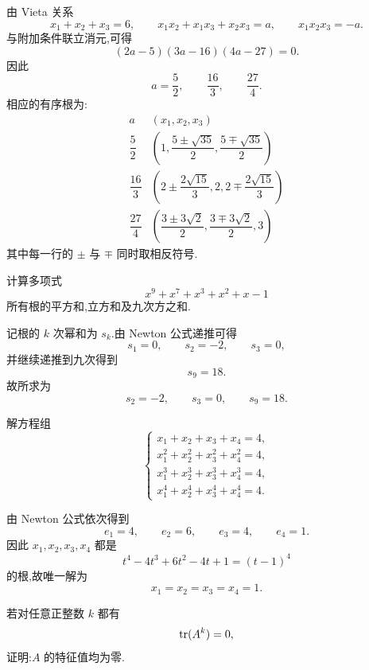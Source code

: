 \begin{solution}
由 Vieta 关系
\[
  x_1+x_2+x_3=6,
  \qquad
  x_1x_2+x_1x_3+x_2x_3=a,
  \qquad
  x_1x_2x_3=-a.
\]
与附加条件联立消元,可得
\[
  (2a-5)(3a-16)(4a-27)=0.
\]
因此
\[
  a=\dfrac52,\qquad \dfrac{16}{3},\qquad \dfrac{27}{4}.
\]
相应的有序根为:
\[
\begin{array}{c|c}
 a & (x_1,x_2,x_3)\\ \hline
 \dfrac52 & \left(1,\dfrac{5\pm\sqrt{35}}2,\dfrac{5\mp\sqrt{35}}2\right)\\[1.2ex]
 \dfrac{16}{3} & \left(2\pm\dfrac{2\sqrt{15}}3,2,2\mp\dfrac{2\sqrt{15}}3\right)\\[1.2ex]
 \dfrac{27}{4} & \left(\dfrac{3\pm3\sqrt2}{2},\dfrac{3\mp3\sqrt2}{2},3\right)
\end{array}
\]
其中每一行的 $\pm$ 与 $\mp$ 同时取相反符号.
\end{solution}

\begin{example}
计算多项式
\[
  x^9+x^7+x^3+x^2+x-1
\]
所有根的平方和,立方和及九次方之和.
\end{example}
\exampleblank

\begin{solution}
记根的 $k$ 次幂和为 $s_k$.由 Newton 公式递推可得
\[
  s_1=0,
  \qquad
  s_2=-2,
  \qquad
  s_3=0,
\]
并继续递推到九次得到
\[
  s_9=18.
\]
故所求为
\[
  \boxed{s_2=-2,\qquad s_3=0,\qquad s_9=18}.
\]
\end{solution}

\begin{example}
解方程组
\[
\begin{cases}
  x_1+x_2+x_3+x_4=4,\\
  x_1^2+x_2^2+x_3^2+x_4^2=4,\\
  x_1^3+x_2^3+x_3^3+x_4^3=4,\\
  x_1^4+x_2^4+x_3^4+x_4^4=4.
\end{cases}
\]
\end{example}
\exampleblank

\begin{solution}
由 Newton 公式依次得到
\[
  e_1=4,
  \qquad e_2=6,
  \qquad e_3=4,
  \qquad e_4=1.
\]
因此 $x_1,x_2,x_3,x_4$ 都是
\[
  t^4-4t^3+6t^2-4t+1=(t-1)^4
\]
的根,故唯一解为
\[
  \boxed{x_1=x_2=x_3=x_4=1}.
\]
\end{solution}

\begin{example}[\markstar]
若对任意正整数 $k$ 都有
\[
  \operatorname{tr}(A^k)=0,
\]
证明:$A$ 的特征值均为零.
\end{example}
\exampleblank

